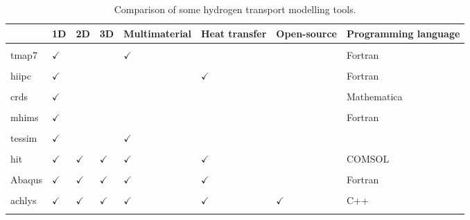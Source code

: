 \begin{table} [h]
    \centering
    \begin{tabular}{L{2cm} L{0.5cm} L{0.5cm} L{0.6cm} L{1.7cm} l l l }
        & 1D & 2D & 3D & Multimaterial & Heat transfer & Open-source & Programming language \\
        \hline \\
        \acrshort{tmap7} \cite{longhurst_tmap7_2008} & $\checkmark$ & & & $\checkmark$ & & & Fortran\\
        \\
        \acrshort{hiipc} \cite{sang_modelling_2012} & $\checkmark$ & & & & $\checkmark$ & & Fortran\\
        \\
        \acrshort{crds} \cite{matveev_reaction-diffusion_2018} & $\checkmark$ & & & & & & Mathematica \\
        \\
        \acrshort{mhims} \cite{hodille_study_2016} & $\checkmark$ & & & & & & Fortran \\
        \\
        \acrshort{tessim} \cite{schmid_transport_2014} & $\checkmark$ & & & $\checkmark$ & & & \\
        \\
        \acrshort{hit} \cite{candido_integrated_2020} & $\checkmark$ & $\checkmark$ & $\checkmark$ & $\checkmark$ & $\checkmark$ & & COMSOL\\
        \\
        Abaqus \cite{benannoune_multidimensional_2020} & $\checkmark$ & $\checkmark$ & $\checkmark$ & $\checkmark$ & $\checkmark$ & & Fortran\\
        \\
        \gls{achlys} \cite{dixon_aurora-multiphysicsachlys_2021} & $\checkmark$ & $\checkmark$ & $\checkmark$ & $\checkmark$ & $\checkmark$ & $\checkmark$ & C++\\
        \\
    \end{tabular}
    \caption{Comparison of some hydrogen transport modelling tools.}
\end{table}

